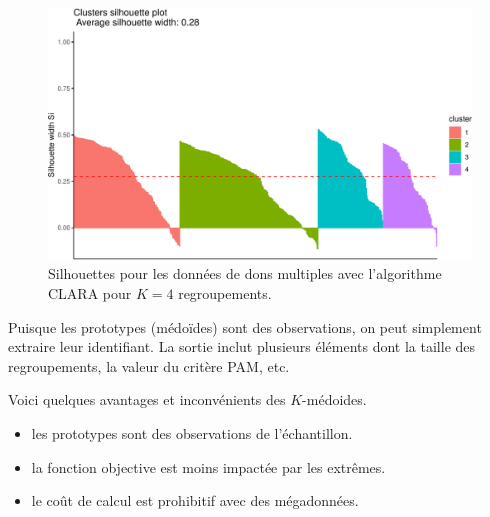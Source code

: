 \documentclass[
  11pt,
  letterpaper,
]{book}
\newenvironment{Shaded}{\begin{snugshade}}{\end{snugshade}}
\newcommand{\CommentTok}[1]{\textcolor[rgb]{0.37,0.37,0.37}{#1}}
\newcommand{\DecValTok}[1]{\textcolor[rgb]{0.68,0.00,0.00}{#1}}
\newcommand{\NormalTok}[1]{\textcolor[rgb]{0.00,0.23,0.31}{#1}}
\newcommand{\OtherTok}[1]{\textcolor[rgb]{0.00,0.23,0.31}{#1}}
\newcommand{\SpecialCharTok}[1]{\textcolor[rgb]{0.37,0.37,0.37}{#1}}
\providecommand{\tightlist}{%
  \setlength{\itemsep}{0pt}\setlength{\parskip}{0pt}}\usepackage{longtable,booktabs,array}
\theoremstyle{definition}
\theoremstyle{remark}
\begin{document}
\begin{figure}[ht!]

{\centering \includegraphics[width=1\textwidth,height=\textheight]{./03-regroupements_files/figure-pdf/fig-clarasilhouette-1.pdf}

}

\caption{\label{fig-clarasilhouette}Silhouettes pour les données de dons
multiples avec l'algorithme CLARA pour \(K=4\) regroupements.}

\end{figure}

Puisque les prototypes (médoïdes) sont des observations, on peut
simplement extraire leur identifiant. La sortie inclut plusieurs
éléments dont la taille des regroupements, la valeur du critère PAM,
etc.

\begin{Shaded}
\end{Shaded}

Voici quelques avantages et inconvénients des \(K\)-médoides.

\begin{itemize}
\tightlist
\item
  les prototypes sont des observations de l'échantillon.
\item
  la fonction objective est moins impactée par les extrêmes.
\item
  le coût de calcul est prohibitif avec des mégadonnées.
\end{itemize}
\end{document}
